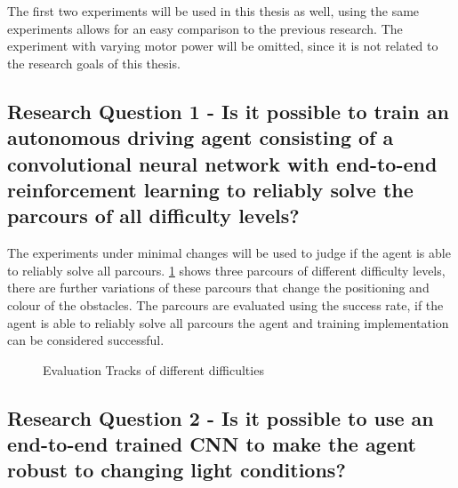 The first two experiments will be used in this thesis as well, using the same experiments allows for an easy comparison to the previous research. The experiment with varying motor power will be omitted, since it is not related to the research goals of this thesis.


\subsection{Research Question 1 - Is it possible to train an autonomous driving agent consisting of a convolutional neural network with end-to-end reinforcement learning to reliably solve the parcours of all difficulty levels?}

The experiments under minimal changes will be used to judge if the agent is able to reliably solve all parcours. \ref{fig:3tracks} shows three parcours of different difficulty levels, there are further variations of these parcours that change the positioning and colour of the obstacles. The parcours are evaluated using the success rate, if the agent is able to reliably solve all parcours the agent and training implementation can be considered successful.

\begin{figure}
    \centering
    \qquad
    \qquad
    \qquad
    \caption{Evaluation Tracks of different difficulties}
    \label{fig:3tracks}
\end{figure}

\subsection{Research Question 2 - Is it possible to use an end-to-end trained CNN to make the agent robust to changing light conditions?}

